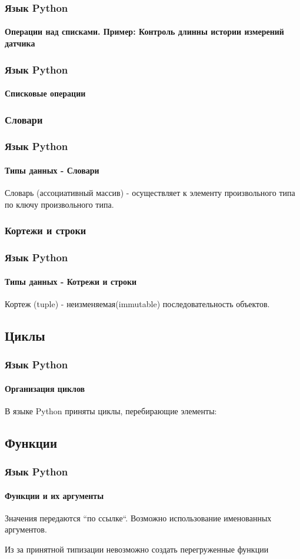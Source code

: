 \documentclass{beamer}
\begin{document}
\begin{frame}
\frametitle{Язык Python}
\framesubtitle{Операции над списками. Пример: Контроль длинны истории измерений датчика}

\end{frame}

\begin{frame}
\frametitle{Язык Python}
\framesubtitle{Списковые операции}

\end{frame}

\subsubsection{Словари}
\begin{frame}
\frametitle{Язык Python}
\framesubtitle{Типы данных - Словари}
Словарь (ассоциативный массив) - осуществляет к элементу произвольного типа по ключу произвольного типа.

\end{frame}

\subsubsection{Кортежи и строки}
\begin{frame}
\frametitle{Язык Python}
\framesubtitle{Типы данных - Котрежи и строки}
Кортеж (tuple) - \alert{неизменяемая}(immutable) последовательность объектов.

\end{frame}

\subsection{Циклы}
\begin{frame}
\frametitle{Язык Python}
\framesubtitle{Организация циклов}
В языке Python приняты циклы, перебирающие элементы:

\end{frame}

\subsection{Функции}
\begin{frame}
\frametitle{Язык Python}
\framesubtitle{Функции и их аргументы}
Значения передаются ``по ссылке``. Возможно использование именованных аргументов.

Из за принятной типизации невозможно создать перегруженные функции
\end{frame}
\end{document}
